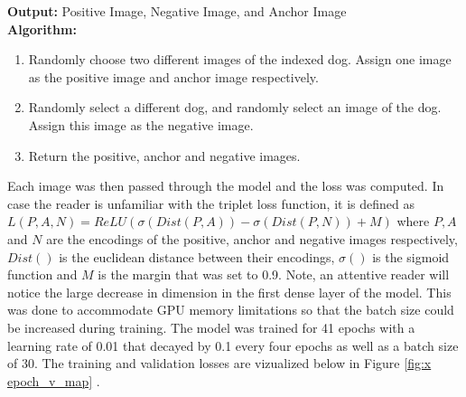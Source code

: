 \documentclass{article}
\begin{document}
\begin{enumerate}
\begin{minipage}{1\textwidth}
      \noindent \textbf{Output:} Positive Image, Negative Image, and Anchor Image \\
      
      \noindent \textbf{Algorithm:} \\
    \end{minipage}%
    
    \begin{enumerate}
    
      \item Randomly choose two different images of the indexed dog.  Assign one image as the positive image and anchor image respectively. 
    
      \item Randomly select a different dog, and randomly select an image of the dog.  Assign this image as the negative image.
      
      \item Return the positive, anchor and negative images.
    
    \end{enumerate}

Each image was then passed through the model and the loss was computed.  In case the reader is unfamiliar with the triplet loss function,  it is defined as $L(P, A, N) = ReLU(\sigma(Dist(P, A)) - \sigma(Dist(P, N)) + M)$ where $P, A$ and $N$ are the encodings of the positive, anchor and negative images respectively, $Dist()$ is the euclidean distance between their encodings, $\sigma()$ is the sigmoid function and $M$ is the margin that was set to 0.9.  Note, an attentive reader will notice the large decrease in dimension in the first dense layer of the model.  This was done to accommodate GPU memory limitations so that the batch size could be increased during training.   The model was trained for 41 epochs with a learning rate of 0.01 that decayed by 0.1 every four epochs as well as a batch size of 30.  The training and validation losses are vizualized below in Figure \ref{fig:x epoch_v_map} .


\end{enumerate}
\end{document}
